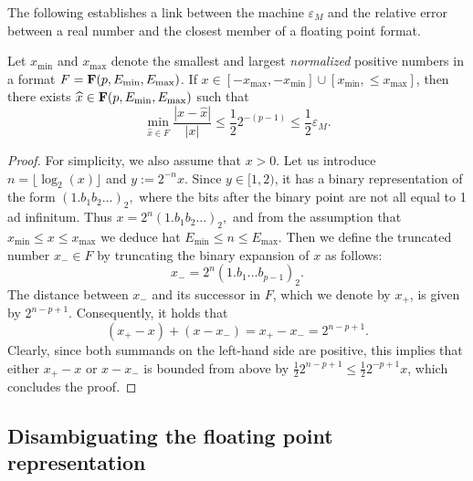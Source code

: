The following establishes a link between the machine $\varepsilon_M$ and
the relative error between a real number and the closest member of a floating point format.
\begin{proposition}
    \label{prop:relative_error_and_machine_epsilon}
    Let $x_{\min}$ and $x_{\max}$ denote the smallest and largest \emph{normalized} positive numbers in a format $F = \mathbf F(p, E_{\min}, E_{\max})$.
    If $x \in [-x_{\max}, -x_{\min}] \cup [x_{\min}, \leq x_{\max}]$,
    then there exists $\widehat x \in \mathbf F(p, E_{\min}, E_{\max})$ such that
    \begin{equation}
        \label{eq:bound_epsilon_machine}
        \min_{\widehat x \in F} \frac{|x - \widehat x|}{|x|} \leq \frac{1}{2} 2^{-(p-1)}
        \leq \frac{1}{2} \varepsilon_M.
    \end{equation}
\end{proposition}
\begin{proof}
    For simplicity, we also assume that $x > 0$.
    Let us introduce $n = \lfloor \log_2(x) \rfloor$ and $y := 2^{-n} x$.
    Since $y \in [1, 2)$,
    it has a binary representation of the form
    \(
        (1.b_1 b_2\dots)_2,
    \)
    where the bits after the binary point are not all equal to 1 ad infinitum.
    Thus
    \(
        x = 2^{n} (1.b_1 b_2\dots)_2,
    \)
    and from the assumption that $x_{\min} \leq x \leq x_{\max}$
    we deduce hat $E_{\min} \leq n \leq E_{\max}$.
    Then we define the truncated number $x_- \in F$ by truncating the binary expansion of $x$ as follows:
    \[
        x_- = 2^n (1.b_1 \dots b_{p-1})_2.
    \]
    The distance between $x_-$ and its successor in $F$,
    which we denote by $x_+$, is given by $2^{n-p+1}$.
    Consequently, it holds that
    \[
        (x_+ - x) + (x-x_-) = x_+ - x_- = 2^{n-p+1}.
    \]
    Clearly, since both summands on the left-hand side are positive,
    this implies that either $x_+ - x$ or $x - x_-$ is bounded from above by $\frac{1}{2} 2^{n-p+1} \leq \frac{1}{2} 2^{-p+1}x$,
    which concludes the proof.
\end{proof}

\subsection{Disambiguating the floating point representation}%
\label{sub:defining_a_unique_representation}

